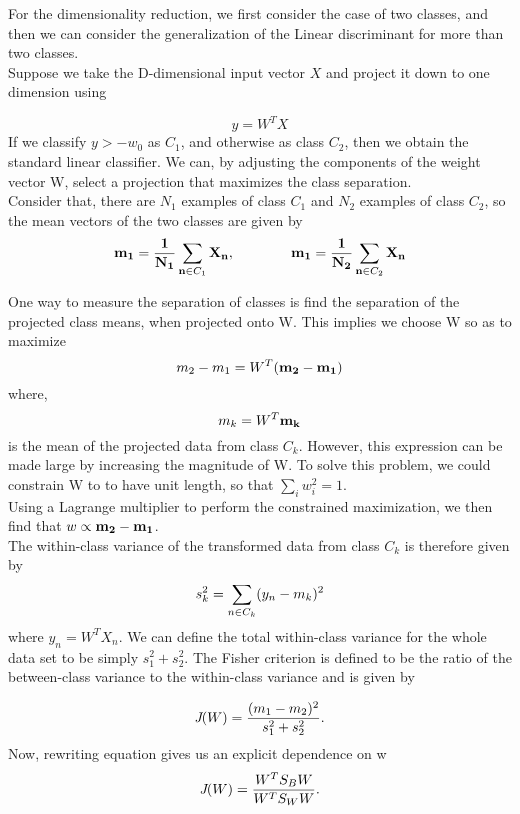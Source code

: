 \documentclass[12pt, letterpaper]{article}
\begin{document}
For the dimensionality reduction, we first consider the case of two classes, and then we can consider the generalization of the Linear discriminant for more than two classes.\\
Suppose we take the D-dimensional input vector \(X\) and project it down to one dimension using 

\[y = W^TX\] If we classify \(y > -w_0\) as \emph{\(C_1\)}, and otherwise as class \emph{\(C_2\)}, then we obtain the standard linear classifier. 
We can, by adjusting the components of the weight vector W, select a projection that maximizes the class separation.\\
Consider that, there are \emph{\(N_1\)} examples of class \emph{\(C_1\)} and \emph{\(N_2\)} examples of class \emph{\(C_2\)}, so the mean vectors of the two classes are given by
\[ \bf{m_1} = \frac{1}{N_1} \sum_{n\in\emph{\(C_1\)}}X_n, \qquad\qquad \bf{m_1} = \frac{1}{N_2} \sum_{n\in\emph{\(C_2\)} }X_n \]

One way to measure the separation of classes is find the separation of the projected class means, when projected onto W. This implies we choose W so as to maximize 
\[m_2 - m_1 = W^T(\bf{m_2 -m_1})\]
where, 
\[m_k = W^T\bf{m_k}\]
is the mean of the projected data from class \emph{\(C_k\)}. However, this expression can be made large by increasing the magnitude of W. To solve this problem, we could constrain W to to have unit length, so that \(\sum_{i} w_i^2 = 1\). \\
Using a Lagrange multiplier to perform the constrained maximization, we then find that \( w \propto \bf{m_2 - m_1 }\).\\
The within-class variance of the transformed data from class \emph{\(C_k\)} is therefore given by 
\[s_k^2 = \sum_{n \in \emph{\(C_k\)}} (y_n - m_k)^2\]
where \(y_n = W^TX_n\). We can define the total within-class variance for the whole data set to be simply \(s_1^2 + s_2^2\). 
The Fisher criterion is defined to be the ratio of the between-class variance to the within-class variance and is given by 

\[\emph{J}(W) = \frac{(m_1 - m_2)^2}{s_1^2 + s_2^2}.\]
Now, rewriting equation gives us an explicit dependence on w
\[\emph{J}(W) = \frac{W^TS_BW}{W^TS_WW}.\]
\end{document}
